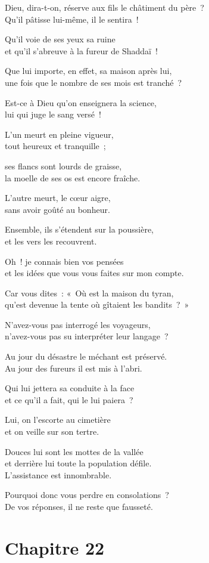 \documentclass[twoside]{book} %
\newcommand{\lnatt}[1]{\reversemarginpar\marginpar[\sffamily\scriptsize #1]{}}
\newcommand{\lpar}[1]{\noindent\hangindent=2\parindent  #1\par} %
\newcommand\chapteropen{} %
\newcommand\chaptercont{} %
\newcommand\chapterclose{} %
\renewcommand{\lnatt}[1]{\marginpar{\sffamily\scriptsize #1}}
\begin{document}
\lpar{Dieu, dira-t-on, réserve aux fils le châtiment du père ? \\
Qu’il pâtisse lui-même, il le sentira !}
\lpar{\lnatt{20}Qu’il voie de ses yeux sa ruine \\
et qu’il s’abreuve à la fureur de Shaddaï !}
\lpar{Que lui importe, en effet, sa maison après lui, \\
une fois que le nombre de ses mois est tranché ?}
\lpar{Est-ce à Dieu qu’on enseignera la science, \\
lui qui juge le sang versé !}
\lpar{L’un meurt en pleine vigueur, \\
tout heureux et tranquille ;}
\lpar{ses flancs sont lourds de graisse, \\
la moelle de ses os est encore fraîche.}
\lpar{\lnatt{25}L’autre meurt, le cœur aigre, \\
sans avoir goûté au bonheur.}
\lpar{Ensemble, ils s’étendent sur la poussière, \\
et les vers les recouvrent.}
\lpar{Oh ! je connais bien vos pensées \\
et les idées que vous vous faites sur mon compte.}
\lpar{Car vous dites : « Où est la maison du tyran, \\
qu’est devenue la tente où gîtaient les bandits ? »}
\lpar{N’avez-vous pas interrogé les voyageurs, \\
n’avez-vous pas su interpréter leur langage ?}
\bigskip
\lpar{\lnatt{30}Au jour du désastre le méchant est préservé. \\
Au jour des fureurs il est mis à l’abri.}
\lpar{Qui lui jettera sa conduite à la face \\
et ce qu’il a fait, qui le lui paiera ?}
\lpar{Lui, on l’escorte au cimetière \\
et on veille sur son tertre.}
\lpar{Douces lui sont les mottes de la vallée \\
et derrière lui toute la population défile. \\
L’assistance est innombrable.}
\bigskip
\lpar{Pourquoi donc vous perdre en consolations ? \\
De vos réponses, il ne reste que fausseté.}
\chapterclose


\chapteropen

\chapter[{Chapitre 22}]{Chapitre 22}
\renewcommand{\leftmark}{Chapitre 22}


\chaptercont
\end{document}
